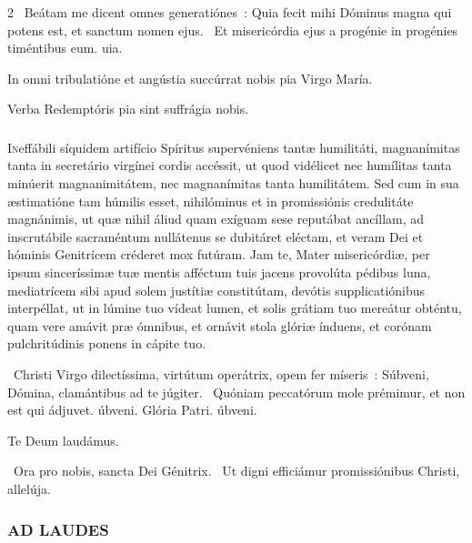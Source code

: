 \documentclass[9pt,twoside]{extarticle}
\begin{document}
\begin{multicols}{2}
~Beátam me dicent omnes generatiónes~: \textred{*} Quia fecit mihi Dóminus magna qui potens est, et sanctum nomen ejus.
~Et misericórdia ejus a progénie in progénies timéntibus eum. uia.

\smallskip
\small {} In omni tribulatióne et angústia succúrrat nobis pia Virgo María.

\smallskip
{}

\smallskip
{} Verba Redemptóris pia sint suffrágia nobis.

\normalsize
\subsubsection*{\center {}}
\lettrine{I}{n}effábili síquidem artifício Spíritus supervéniens tantæ humilitáti, magnanímitas tanta in secretário virgínei cordis accéssit, ut quod vidélicet nec humílitas tanta minúerit magnanimitátem, nec magnanímitas tanta humilitátem. Sed cum in sua æstimatióne tam húmilis esset, nihilóminus et in promissiónis credulitáte magnánimis, ut quæ nihil áliud quam exíguam sese reputábat ancíllam, ad inscrutábile sacraméntum nullátenus se dubitáret eléctam, et veram Dei et hóminis Genitrícem créderet mox futúram. Jam te, Mater misericórdiæ, per ipsum sinceríssimæ tuæ mentis afféctum tuis jacens provolúta pédibus luna, mediatrícem sibi apud solem justítiæ constitútam, devótis supplicatiónibus interpéllat, ut in lúmine tuo vídeat lumen, et solis grátiam tuo mereátur obténtu, quam vere amávit præ ómnibus, et ornávit stola glóriæ índuens, et corónam pulchritúdinis ponens in cápite tuo.

~Christi Virgo dilectíssima, virtútum operátrix, opem fer míseris~: \textred{*} Súbveni, Dómina, clamántibus ad te júgiter. ~Quóniam peccatórum mole prémimur, et non est qui ádjuvet. úbveni. Glória Patri. úbveni.

Te Deum laudámus. 

~Ora pro nobis, sancta Dei Génitrix. ~Ut digni efficiámur promissiónibus Christi, allelúja.

\subsubsection*{\center \normalfont \textsc{AD LAUDES}\\ \normalfont {}}


\end{multicols}
\end{document}
